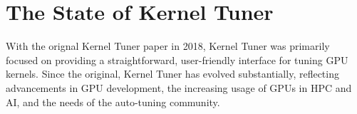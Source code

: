\section{The State of Kernel Tuner}\label{sec:kernel_tuner_background}
With the orignal Kernel Tuner paper in 2018, Kernel Tuner was primarily focused on providing a straightforward, user-friendly interface for tuning GPU kernels. 
Since the original, Kernel Tuner has evolved substantially, reflecting advancements in GPU development, the increasing usage of GPUs in HPC and AI, and the needs of the auto-tuning community. 
